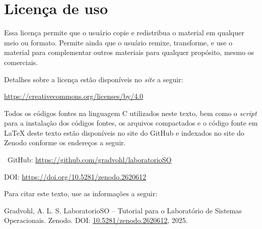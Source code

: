 \chapter*{Licença de uso}\label{chp:licenca}
\doclicenseThis

Essa licença permite que o usuário copie e redistribua o material em qualquer meio ou formato. Permite ainda que o usuário remixe, transforme, e use o material para complementar outros materiais para qualquer propósito, mesmo os comerciais.

 Detalhes sobre a licença estão disponíveis no \textit{site} a seguir:
 \begin{center}
    \url{https://creativecommons.org/licenses/by/4.0}     
 \end{center}

Todos os códigos fontes na linguagem C utilizados neste texto, bem como o \textit{script} para a instalação dos códigos fontes, os arquivos compactados e o código fonte em \LaTeX{} deste texto estão disponíveis no site do GitHub e indexados no site do Zenodo conforme os endereços a seguir.

\faGithub\ GitHub: \url{https://github.com/gradvohl/laboratorioSO}

DOI: \url{https://doi.org/10.5281/zenodo.2620612}

Para citar este texto, use as informações a seguir:

\noindent
{\sc Gradvohl, A. L. S.} LaboratorioSO -- Tutorial para o Laboratório de Sistemas Operacionais. Zenodo. DOI: \href{http://doi.org/10.5281/zenodo.2620612}{10.5281/zenodo.2620612}, 2025.
